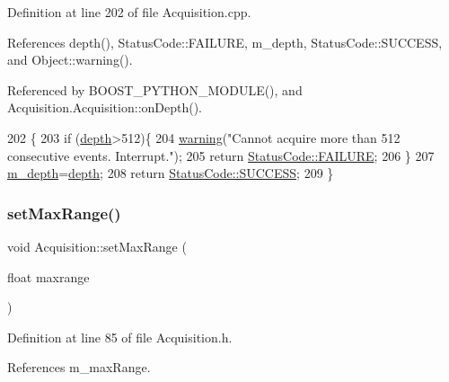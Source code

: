 Definition at line 202 of file Acquisition.\+cpp.



References depth(), Status\+Code\+::\+F\+A\+I\+L\+U\+RE, m\+\_\+depth, Status\+Code\+::\+S\+U\+C\+C\+E\+SS, and Object\+::warning().



Referenced by B\+O\+O\+S\+T\+\_\+\+P\+Y\+T\+H\+O\+N\+\_\+\+M\+O\+D\+U\+L\+E(), and Acquisition.\+Acquisition\+::on\+Depth().


\begin{DoxyCode}
202                                                     \{
203   \textcolor{keywordflow}{if} (\hyperlink{classAcquisition_a1ad973e21a067c0de0b6264d0eb5182b}{depth}>512)\{
204     \hyperlink{classObject_a65cd4fda577711660821fd2cd5a3b4c9}{warning}(\textcolor{stringliteral}{"Cannot acquire more than 512 consecutive events. Interrupt."});
205     \textcolor{keywordflow}{return} \hyperlink{classStatusCode_a6f565cbeadc76d14c72f047e5e85eb4ba3da73d4c469762eb9d3c960368252b26}{StatusCode::FAILURE};
206   \}
207   \hyperlink{classAcquisition_a26628424533a2dd74d24712a14637a72}{m\_depth}=\hyperlink{classAcquisition_a1ad973e21a067c0de0b6264d0eb5182b}{depth};
208   \textcolor{keywordflow}{return} \hyperlink{classStatusCode_a6f565cbeadc76d14c72f047e5e85eb4badd0da38d3ba0d922efd1f4619bc37ad8}{StatusCode::SUCCESS};
209 \}
\end{DoxyCode}
\mbox{\label{classAcquisition_a786da6cff5428020034be23e554e0e1b}} 
\subsubsection{\texorpdfstring{set\+Max\+Range()}{setMaxRange()}\hspace{0.1cm}{\footnotesize\ttfamily [1/2]}}
{\footnotesize\ttfamily void Acquisition\+::set\+Max\+Range (\begin{DoxyParamCaption}\item[{float}]{maxrange }\end{DoxyParamCaption})\hspace{0.3cm}{\ttfamily [inline]}}



Definition at line 85 of file Acquisition.\+h.



References m\+\_\+max\+Range.


